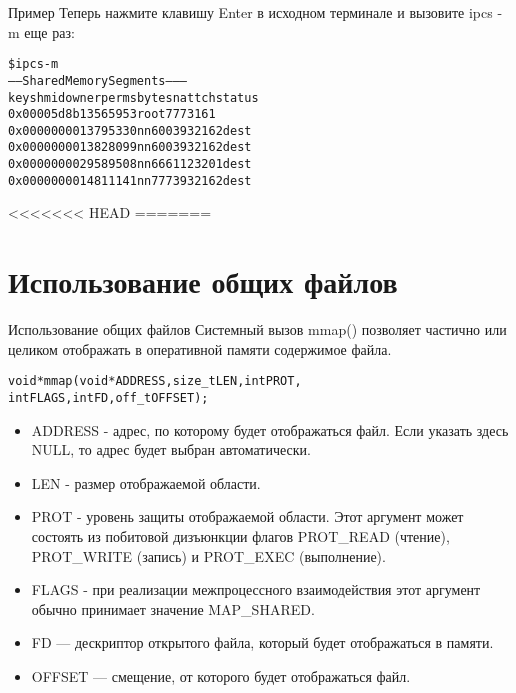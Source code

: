 \documentclass{beamer}
\begin{document}
\begin{frame}[fragile]{Пример}
Теперь нажмите клавишу Enter в исходном терминале и вызовите ipcs -m еще раз:
\begin{alltt}
\$ ipcs -m
------ Shared Memory Segments --------
key shmid owner perms bytes nattch status
0x00005d8b 13565953 root 777 316 1
0x00000000 13795330 nn 600 393216 2 dest
0x00000000 13828099 nn 600 393216 2 dest
0x00000000 29589508 nn 666 112320 1 dest
0x00000000 14811141 nn 777 393216 2 dest
\end{alltt}
\end{frame}

<<<<<<< HEAD
=======
\section{Использование общих файлов}

\begin{frame}[fragile]{Использование общих файлов}
Системный вызов mmap() позволяет частично или целиком отображать в оперативной памяти содержимое файла.
\begin{alltt}
void * mmap (void * ADDRESS, size_t LEN, int PROT,
   int FLAGS, int FD, off_t OFFSET);
\end{alltt}
\begin{itemize}
\item ADDRESS - адрес, по которому будет отображаться файл. Если указать здесь NULL, то адрес будет выбран автоматически.
\item LEN - размер отображаемой области.
\item PROT - уровень защиты отображаемой области. Этот аргумент может состоять из побитовой дизъюнкции флагов 
PROT\_READ (чтение), PROT\_WRITE (запись) и PROT\_EXEC (выполнение).
\item FLAGS - при реализации межпроцессного взаимодействия этот аргумент обычно принимает значение MAP\_SHARED.
\item FD — дескриптор открытого файла, который будет отображаться в памяти.
\item OFFSET — смещение, от которого будет отображаться файл.
\end{itemize}
\end{frame}
\end{document}
